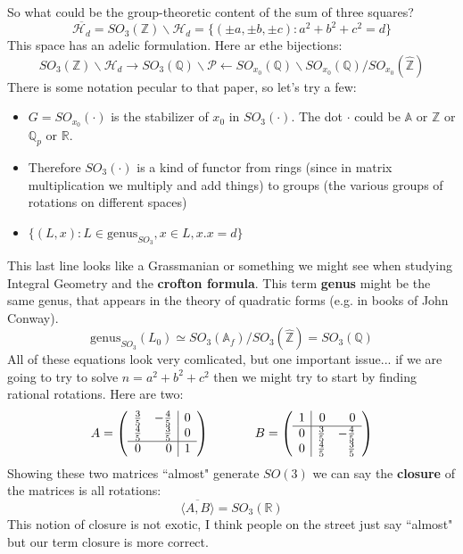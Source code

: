 \documentclass[12pt]{article}
\begin{document}
{\noindent So what could be the group-theoretic content of the sum of three squares?
$$ \overline{\mathcal{H}_d} = SO_3(\mathbb{Z}) \backslash \mathcal{H}_d = 
\{ (\pm a,\pm b,\pm c): a^2 + b^2 + c^2 = d \} $$ 
This space has an adelic formulation.  Here ar ethe bijections:
$$ SO_3(\mathbb{Z})\backslash \mathcal{H}_d \rightarrow SO_3(\mathbb{Q})\backslash \mathcal{P} \leftarrow SO_{x_0}(\mathbb{Q}) \backslash SO_{x_0}(\mathbb{Q}) / 
SO_{x_0}(\mathbb{\hat{Z}}) $$ 
There is some notation pecular to that paper, so let's try a few:
\begin{itemize}
	\item $G = SO_{x_0}(\cdot)$ is the stabilizer of $x_0$ in $SO_3(\cdot)$.  The dot $\cdot$ could be $\mathbb{A}$ or $\mathbb{Z}$ or $\mathbb{Q}_p$ or $\mathbb{R}$.
	\item Therefore $SO_3(\cdot)$ is a kind of functor from rings (since in matrix multiplication we multiply and add things) to groups (the various groups of rotations on different spaces)
	\item $\{ (L, x): L \in \mathrm{genus}_{SO_3}, x \in L, x.x = d \} $
\end{itemize}
This last line looks like a Grassmanian or something we might see when studying Integral Geometry and the \textbf{crofton formula}.  This term \textbf{genus} might be the same genus, that appears in the theory of quadratic forms (e.g. in books of John Conway).
$$ \mathrm{genus}_{SO_3}(L_0) \simeq SO_3(\mathbb{A}_f) / SO_3(\hat{\mathbb{Z}}) = SO_3(\mathbb{Q})$$ 
All of these equations look very comlicated, but one important issue... if we are going to try to solve $n = a^2  + b^2 + c^2$ then we might try to start by finding rational rotations.  Here are two:
$$A = \left( \begin{array}{cr|c}
\frac{3}{5} & -\frac{4}{5} & 0\\  
\frac{4}{5} &  \frac{3}{5} & 0\\ \hline
0  & 0  & 1\\
 \end{array} \right) \hspace{0.5in} 
 B = \left( \begin{array}{c|rr}
 1 & 0 & 0 \\ \hline
0 & \frac{3}{5} & -\frac{4}{5} \\ 
0 & \frac{4}{5} &  \frac{3}{5} \\
 \end{array} \right)
 $$
 Showing these two matrices ``almost" generate $SO(3)$ we can say the \textbf{closure} of
 the matrices is all rotations:
 $$ \overline{\langle A, B \rangle }= SO_3(\mathbb{R})$$  This notion of closure is not exotic, I think people on the street just say ``almost" but our term closure is more correct.
 \newline


}
\end{document}
